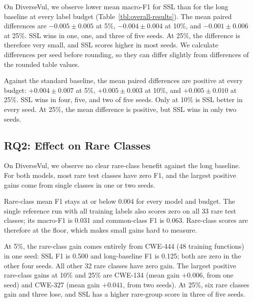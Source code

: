 \documentclass[conference]{IEEEtran}
\begin{document}
On DiverseVul, we observe lower mean macro-F1 for SSL than for the long
baseline at every label budget (Table~\ref{tbl:overall-results}). The
mean paired differences are \(-0.005\pm0.005\) at 5\%,
\(-0.004\pm0.004\) at 10\%, and \(-0.001\pm0.006\) at 25\%. SSL wins in
one, one, and three of five seeds. At 25\%, the difference is therefore
very small, and SSL scores higher in most seeds. We calculate
differences per seed before rounding, so they can differ slightly from
differences of the rounded table values.

Against the standard baseline, the mean paired differences are positive
at every budget: \(+0.004\pm0.007\) at 5\%, \(+0.005\pm0.003\) at 10\%,
and \(+0.005\pm0.010\) at 25\%. SSL wins in four, five, and two of five
seeds. Only at 10\% is SSL better in every seed. At 25\%, the mean
difference is positive, but SSL wins in only two seeds.

\subsection{RQ2: Effect on Rare
Classes}\label{rq2-effect-on-rare-classes}

On DiverseVul, we observe no clear rare-class benefit against the long
baseline. For both models, most rare test classes have zero F1, and the
largest positive gains come from single classes in one or two seeds.

Rare-class mean F1 stays at or below 0.004 for every model and budget.
The single reference run with all training labels also scores zero on
all 33 rare test classes; its macro-F1 is 0.031 and common-class F1 is
0.063. Rare-class scores are therefore at the floor, which makes small
gains hard to measure.

At 5\%, the rare-class gain comes entirely from CWE-444 (48 training
functions) in one seed: SSL F1 is 0.500 and long-baseline F1 is 0.125;
both are zero in the other four seeds. All other 32 rare classes have
zero gain. The largest positive rare-class gains at 10\% and 25\% are
CWE-134 (mean gain \(+0.006\), from one seed) and CWE-327 (mean gain
\(+0.041\), from two seeds). At 25\%, six rare classes gain and three
lose, and SSL has a higher rare-group score in three of five seeds.
\end{document}
